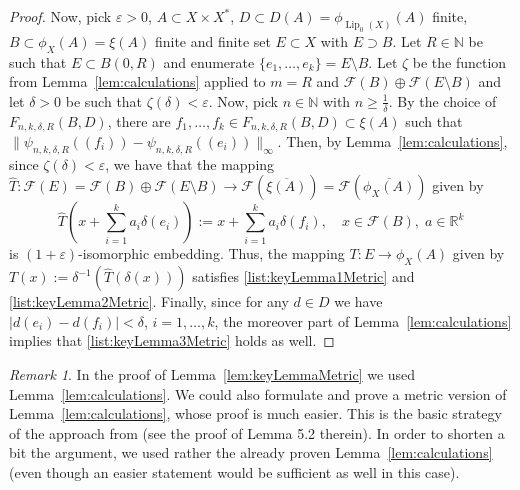 \documentclass[11pt]{amsart}
\theoremstyle{definition}
\theoremstyle{remark}
\newtheorem{remark}[thm]{Remark}
\newcommand{\Rea}{\mathbb R}
\newcommand{\Nat}{\mathbb N}
\newcommand{\F}{\mathcal F}
\def \Lip {\operatorname{Lip}}
\begin{document}
\begin{proof}
Now, pick $\varepsilon>0$, $A\subset X\times X^*$, $D\subset D(A) = \phi_{\Lip_0(X)}(A)$ finite, $B\subset \phi_X(A) = \xi(A)$ finite and finite set $E\subset X$ with $E\supset B$. Let $R\in\Nat$ be such that $E\subset B(0,R)$ and enumerate $\{e_1,\ldots,e_k\} = E\setminus B$. Let $\zeta$ be the function from Lemma~\ref{lem:calculations} applied to $m=R$ and $\F(B)\oplus \F(E\setminus B)$ and let $\delta>0$ be such that $\zeta(\delta)<\varepsilon$. Now, pick $n\in \Nat$ with $n\geq \tfrac{1}{\delta}$. By the choice of $F_{n,k,\delta,R}(B,D)$, there are $f_1,\ldots,f_k\in F_{n,k,\delta,R}(B,D)\subset \xi(A)$ such that $\|\psi_{n,k,\delta,R}((f_i)) - \psi_{n,k,\delta,R}((e_i))\|_\infty$. Then, by Lemma~\ref{lem:calculations}, since $\zeta(\delta)<\varepsilon$, we have that the mapping $\widehat{T}:\F(E) = \F(B)\oplus \F(E\setminus B)\to \F(\overline{\xi(A)}) = \F(\overline{\phi_X(A)})$ given by
 \[
 \widehat{T}(x+\sum_{i=1}^{k}a_i \delta(e_i)):=x+\sum_{i=1}^{k}a_i \delta(f_i),\quad x\in \F(B),\; a\in \Rea^{k}
 \]
 is $(1+\varepsilon)$-isomorphic embedding. Thus, the mapping $T:E\to \phi_X(A)$ given by $T(x):=\delta^{-1}(\widehat{T}(\delta(x)))$ satisfies \ref{list:keyLemma1Metric} and \ref{list:keyLemma2Metric}. Finally, since for any $d\in D$ we have $|d(e_i)-d(f_i)|<\delta$, $i=1,\ldots,k$, the moreover part of Lemma~\ref{lem:calculations} implies that \ref{list:keyLemma3Metric} holds as well.
\end{proof}

\begin{remark}In the proof of Lemma~\ref{lem:keyLemmaMetric} we used Lemma~\ref{lem:calculations}. We could also formulate and prove a metric version of Lemma~\ref{lem:calculations}, whose proof is much easier. This is the basic strategy of the approach from \cite{QuilisZoca} (see the proof of Lemma 5.2 therein). In order to shorten a bit the argument, we used rather the already proven Lemma~\ref{lem:calculations} (even though an easier statement would be sufficient as well in this case).
\end{remark}
\end{document}
